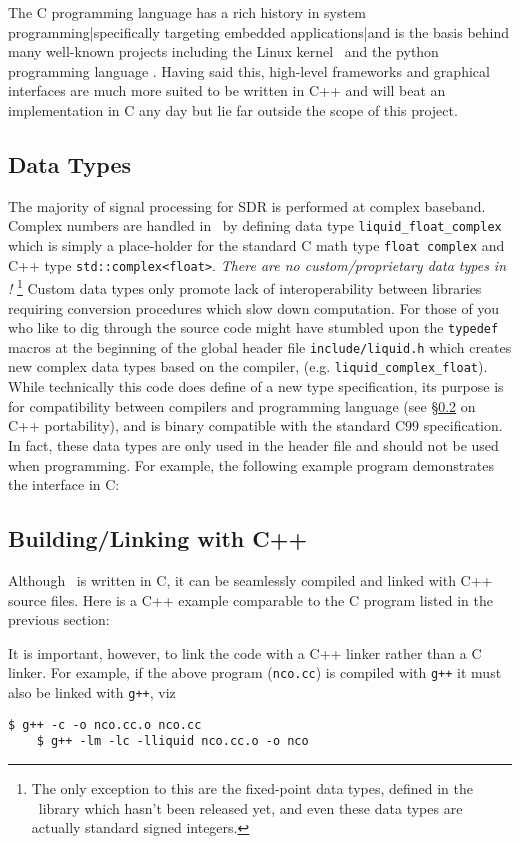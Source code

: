 The C programming language has a rich history in system
programming|specifically targeting embedded applications|and is the
basis behind many well-known projects including the Linux
kernel~\cite{linux-kernel:web}
and the python programming language \cite{python:web}.
Having said this, high-level frameworks and graphical interfaces are
much more suited to be written in C++ and will beat an implementation in
C any day but lie far outside the scope of this project.

\subsection{Data Types}
\label{section:data_structures:data_types}
The majority of signal processing for SDR is performed at complex baseband.
Complex numbers are handled in \liquid\ by defining data type
{\tt liquid\_float\_complex} which is simply a place-holder for the
standard
C math type {\tt float complex} and C++ type {\tt std::complex<float>}.
{\em There are no custom/proprietary data types in \liquid!}%
\footnote{
    The only exception to this are the fixed-point data types,
    defined in the \liquidfpm\ library which hasn't been released yet,
    and even these data types are actually standard signed integers.}
Custom data types only promote lack of interoperability between
libraries requiring conversion procedures which slow down computation.
For those of you who like to dig through the source code might have
stumbled upon the {\tt typedef} macros at the beginning of the global 
header file {\tt include/liquid.h} which creates new complex data types
based on the compiler, 
(e.g. {\tt liquid\_complex\_float}).
While technically this code does define of a new type specification,
its purpose is for compatibility between compilers and programming
language
(see \S\ref{section:data_structures:c++} on C++ portability),
and is binary compatible with the standard C99 specification.
In fact, these data types are only used in the header file and should
not be used when programming.
For example, the following example program demonstrates the interface in
C:
%

%


\subsection{Building/Linking with C++}
\label{section:data_structures:c++}
Although \liquid\ is written in C, it can be seamlessly compiled and linked
with C++ source files.
Here is a C++ example comparable to the C program listed in the previous
section:
%

%
It is important, however, to link the code with a C++ linker rather than
a C linker.
For example, if the above program ({\tt nco.cc}) is compiled with
{\tt g++} it must also be linked with {\tt g++}, viz
%
\begin{Verbatim}[fontsize=\small]
    $ g++ -c -o nco.cc.o nco.cc
    $ g++ -lm -lc -lliquid nco.cc.o -o nco
\end{Verbatim}
%

